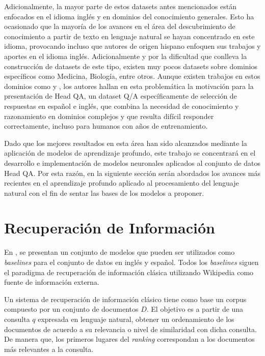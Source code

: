 Adicionalmente, la mayor parte de estos datasets antes mencionados están enfocados en el idioma inglés y en dominios del conocimiento generales. Esto ha ocasionado que la mayoría de los avances en el área del descubrimiento de conocimiento a partir de texto en lenguaje natural se hayan concentrado en este idioma, provocando incluso que autores de origen hispano enfoquen sus trabajos y aportes en el idioma inglés. Adicionalmente y por la dificultad que conlleva la construcción de datasets de este tipo, existen muy pocos datasets sobre dominios específicos como Medicina, Biología, entre otros. Aunque existen trabajos en estos dominios como \cite{2015-semantic-medical-texts} y \cite{2018-nentidis-results}, los autores \cite{2019-head-qa} hallan en esta problemática la motivación para la presentación de Head QA, un dataset Q/A específicamente de selección de respuestas en español e inglés, que combina la necesidad de conocimiento y razonamiento en dominios complejos y que resulta difícil responder correctamente, incluso para humanos con años de entrenamiento.

Dado que los mejores resultados en esta área han sido alcanzados mediante la aplicación de modelos de aprendizaje profundo, este trabajo se concentrará en el desarrollo e implementación de modelos neuronales aplicados al conjunto de datos Head QA. Por esta razón, en la siguiente sección serán abordados los avances más recientes en el aprendizaje profundo aplicado al procesamiento del lenguaje natural con el fin de sentar las bases de los modelos a proponer.

\section{Recuperación de Información}

En \cite{2019-head-qa}, se presentan un conjunto de modelos que pueden ser utilizados como \textit{baselines} para el conjunto de datos en inglés y español. Todos los \textit{baselines} siguen el paradigma de recuperación de información clásica utilizando Wikipedia como fuente de información externa. 

Un sistema de recuperación de información clásico tiene como base un corpus compuesto por un conjunto de documentos $D$. El objetivo es a partir de una consulta $q$ expresada en lenguaje natural, obtener un ordenamiento de los documentos de acuerdo a su relevancia o nivel de similaridad con dicha consulta. De manera que, los primeros lugares del \textit{ranking} correspondan a los documentos más relevantes a la consulta.

